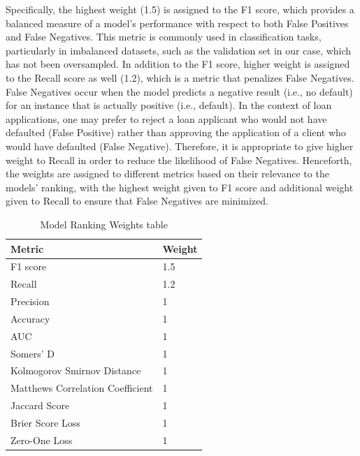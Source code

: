 Specifically, the highest weight (1.5) is assigned to the F1 score, which provides a balanced measure of a model's performance with respect to both False Positives and False Negatives.
This metric is commonly used in classification tasks, particularly in imbalanced datasets, such as the validation set in our case, which has not been oversampled.
In addition to the F1 score, higher weight is assigned to the Recall score as well (1.2), which is a metric that penalizes False Negatives.
False Negatives occur when the model predicts a negative result (i.e., no default) for an instance that is actually positive (i.e., default).
In the context of loan applications, one may prefer to reject a loan applicant who would not have defaulted (False Positive) rather than approving the application of a client who would have defaulted (False Negative). Therefore, it is appropriate to give higher weight to Recall in order to reduce the likelihood of False Negatives.
Henceforth, the weights are assigned to different metrics based on their relevance to the models' ranking, with the highest weight given to F1 score and additional weight given to Recall to ensure that False Negatives are minimized.

\begin{table}[H]
    \small
    \setlength{\tabcolsep}{8pt}
    \renewcommand{\arraystretch}{1.3}
    \centering
        \caption[Model Ranking Weights table]{Model Ranking Weights table}\label{tab:weightsrank}
        \begin{tabular}{ll}
    \toprule
    \textbf{Metric} & \textbf{Weight}\\
    \midrule
    \hline
    F1 score & 1.5 \\
    Recall & 1.2 \\
    Precision & 1 \\
    Accuracy & 1 \\
    AUC & 1 \\
    Somers' D & 1 \\ 
    Kolmogorov Smirnov Distance  & 1 \\
    Matthews Correlation Coefficient  & 1 \\
    Jaccard Score  & 1 \\
    Brier Score Loss  & 1 \\
    Zero-One Loss  & 1 \\
    \hline
    \bottomrule
    \end{tabular}
    \vspace{0.7em}

    \vspace{-1em}
\end{table}



